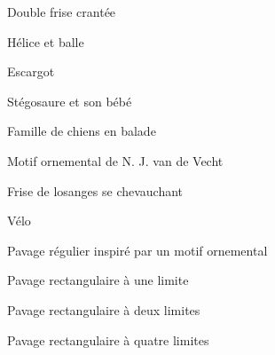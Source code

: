 \begin{figure}[htbp]
 \caption{Double frise crantée}
 \label{fig:dfrisec}
\end{figure}
\begin{figure}[htbp]
 \caption{Hélice et balle}
 \label{fig:heba}
\end{figure}
\begin{figure}[htbp]
 \caption{Escargot}
 \label{fig:escar}
\end{figure}
\begin{figure}[htbp]
 \caption{Stégosaure et son bébé}
 \label{fig:steg2}
\end{figure}
\begin{figure}[htbp]
 \caption{Famille de chiens en balade}
 \label{fig:chiens}
\end{figure}
\begin{figure}[htbp]
 \caption{Motif ornemental de N. J. van de Vecht}
 \label{fig:mVdV}
\end{figure}
\begin{figure}[htbp]
 \caption{Frise de losanges se chevauchant}
 \label{fig:frlos}
\end{figure}
\begin{figure}[htbp]
 \caption{Vélo}
 \label{fig:velo}
\end{figure}
\begin{figure}[htbp]
 \caption{Pavage régulier inspiré par un motif ornemental\label{fig:PVdV}}
\end{figure}
\begin{figure}[htbp]
 \caption{Pavage rectangulaire à une limite}
 \label{fig:PVdV1l}
\end{figure}
\begin{figure}[htbp]
 \caption{Pavage rectangulaire à deux limites}
 \label{fig:PVdV2l}
\end{figure}
\begin{figure}[htbp]
 \caption{Pavage rectangulaire à quatre limites}
 \label{fig:PVdV4l}
\end{figure}

